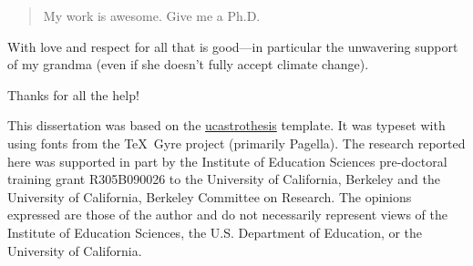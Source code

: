 \documentclass[12pt]{myucthesis}
\begin{document}
\ssp %
\hypersetup{pageanchor=false}

\maketitle
\copyrightpage

\begin{abstract}
My work is awesome. Give me a Ph.D.
\end{abstract}

\hypersetup{pageanchor=true}
\begin{frontmatter}

\begin{dedication}
\null\vfil
{\large
\begin{center}
With love and respect for all that is good---in particular the unwavering
support of my grandma (even if she doesn't fully accept climate change).
\end{center}}
\null\vfil
\end{dedication}

\tableofcontents
\listoffigures %
\listoftables %


\begin{acknowledgements}
Thanks for all the help!


This dissertation was based on the
\href{https://github.com/pkgw/ucastrothesis}{\textsf{ucastrothesis}} template.
It was typeset with  using fonts from the \TeX\ Gyre project
(primarily Pagella). The research reported here was supported in part by the
Institute of Education Sciences pre-doctoral training grant R305B090026 to the
University of California, Berkeley and the University of California, Berkeley
Committee on Research. The opinions expressed are those of the author and do not
necessarily represent views of the Institute of Education Sciences, the U.S.
Department of Education, or the University of California.

\end{acknowledgements}
\end{frontmatter}
\end{document}
